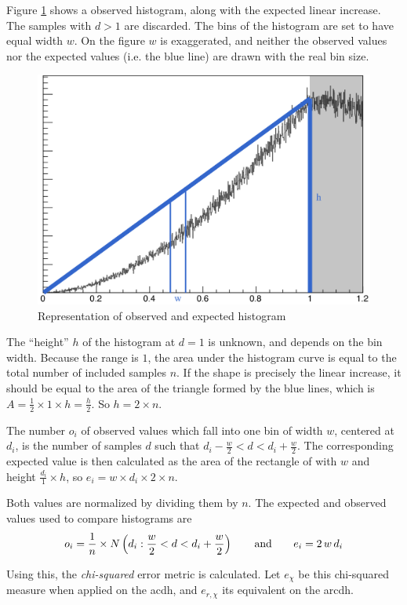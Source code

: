 Figure \ref{fig:hist_tri} shows a observed histogram, along with the expected linear increase. The samples with $d > 1$ are discarded. The bins of the histogram are set to have equal width $w$. On the figure $w$ is exaggerated, and neither the observed values nor the expected values (i.e. the blue line) are drawn with the real bin size.

\begin{figure}[h]
\centering
\includegraphics[width=.5\textwidth]{fig/hist_tri.png}
\caption{Representation of observed and expected histogram}
\label{fig:hist_tri}
\end{figure}

The ``height'' $h$ of the histogram at $d = 1$ is unknown, and depends on the bin width. Because the range is $1$, the area under the histogram curve is equal to the total number of included samples $n$. If the shape is precisely the linear increase, it should be equal to the area of the triangle formed by the blue lines, which is $A = \frac{1}{2} \times 1 \times h = \frac{h}{2}$. So $h = 2 \times n$.

The number $o_i$ of observed values which fall into one bin of width $w$, centered at $d_i$, is the number of samples $d$ such that $d_i - \frac{w}{2} < d < d_i + \frac{w}{2}$. The corresponding expected value is then calculated as the area of the rectangle of with $w$ and height $\frac{d_i}{1} \times h$, so $e_i = w \times d_i \times 2 \times n$.

Both values are normalized by dividing them by $n$. The expected and observed values used to compare histograms are
\begin{equation}
o_i = \frac{1}{n} \times N\left(d_i : \frac{w}{2} < d < d_i + \frac{w}{2}\right)
\hspace{7mm} \text{and} \hspace{7mm}
e_i = 2 \, w \, d_i
\end{equation}

Using this, the \emph{chi-squared} error metric is calculated. Let $e_{\chi}$ be this chi-squared measure when applied on the \gls{acdh}, and $e_{r,\chi}$ its equivalent on the \gls{arcdh}.

